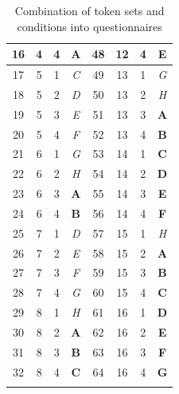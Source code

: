 \documentclass[output=paper,
modfonts
]{langscibook}
\begin{document}
\begin{table}[H]
\begin{tabular}{cccc|cccc}
\midrule
16  & 4 & 4 & \textbf{A}    & 48 & 12 & 4 & \textbf{E} \\
\midrule \midrule
17  & 5 & 1 & \textit{C}    & 49 & 13 & 1 & \textit{G} \\
\midrule
18  & 5 & 2 & \textit{D}    & 50 & 13 & 2 & \textit{H} \\
\midrule
19  & 5 & 3 & \textit{E}    & 51 & 13 & 3 & \textbf{A} \\
\midrule
20  & 5 & 4 & \textit{F}    & 52 & 13 & 4 & \textbf{B} \\
\midrule
21 & 6 & 1 & \textit{G}     & 53 & 14 & 1 & \textbf{C} \\
\midrule
22 & 6 & 2 & \textit{H}     & 54 & 14 & 2 & \textbf{D} \\
\midrule
23 & 6 & 3 & \textbf{A}     & 55 & 14 & 3 & \textbf{E} \\
\midrule
24 & 6 & 4 & \textbf{B}     & 56 & 14 & 4 & \textbf{F} \\
\midrule \midrule
25 & 7 & 1 & \textit{D}     & 57 & 15 & 1 & \textit{H} \\
\midrule
26 & 7 & 2 & \textit{E}     & 58 & 15 & 2 & \textbf{A} \\
\midrule
27 & 7 & 3 & \textit{F}     & 59 & 15 & 3 & \textbf{B} \\
\midrule
28 & 7 & 4 & \textit{G}     & 60 & 15 & 4 & \textbf{C} \\
\midrule
29 & 8 & 1 & \textit{H}     & 61 & 16 & 1 & \textbf{D} \\
\midrule
30 & 8 & 2 & \textbf{A}     & 62 & 16 & 2 & \textbf{E} \\
\midrule
31 & 8 & 3 & \textbf{B}     & 63 & 16 & 3 & \textbf{F} \\
\midrule
32 & 8 & 4 & \textbf{C}     & 64 & 16 & 4 & \textbf{G} \\
\lspbottomrule
\end{tabular}
\caption{Combination of token sets and conditions into questionnaires}
\label{tab:questionnaire_combos}
\end{table}
\end{document}
